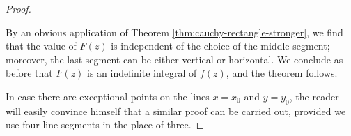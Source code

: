 \begin{proof}
\begin{figure}[h]
\begin{asy}
\end{asy}
\end{figure}

By an obvious application of Theorem \ref{thm:cauchy-rectangle-stronger}, we find that the value of $F(z)$ is independent of the choice of the middle segment; moreover, the last segment can be either vertical or horizontal. We conclude as before that $F(z)$ is an indefinite integral of $f(z)$, and the theorem follows.

In case there are exceptional points on the lines $x=x_0$ and $y=y_0$, the reader will easily convince himself that a similar proof can be carried out, provided we use four line segments in the place of three.
\end{proof}